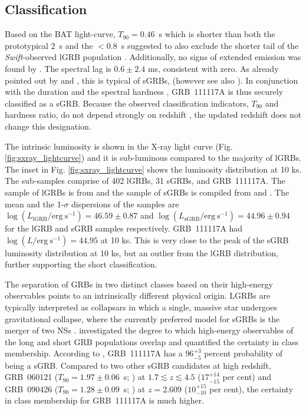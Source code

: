 \documentclass[referee]{aa}
\begin{document}
\subsection{Classification} \label{classification}

Based on the BAT light-curve, $T_{90}=0.46$~s which is shorter than both the
prototypical 2~s \citep{Kouveliotou1993} and the $<0.8$~s suggested to also
exclude the shorter tail of the \textit{Swift}-observed lGRB population
\citep{Bromberg2012a}. Additionally, no signs of extended emission was found by
\citet{Sakamoto2013}. The spectral lag is $0.6 \pm2.4$ ms, consistent with zero.
As already pointed out by \citet{Margutti2012} and \citet{Sakamoto2013}, this is
typical of sGRBs, (however see also \citealt{Bernardini2015}). In conjunction
with the duration and the spectral hardness \citep{Sakamoto2011}, GRB~111117A is
thus securely classified as a sGRB. Because the observed classification
indicators, $T_{90}$ and hardness ratio, do not depend strongly on redshift
\citep{Littlejohns2013a}, the updated redshift does not change this designation.

The intrinsic luminosity is shown in the X-ray light curve (Fig.
\ref{fig:sxray_lightcurve}) and it is sub-luminous compared to the majority of
lGRBs. The inset in Fig. \ref{fig:sxray_lightcurve} shows the luminosity
distribution at 10 ks. The sub-samples comprise of 402 lGRBs, 31 sGRBs, and
GRB~111117A. The sample of lGRBs is from \citet{Evans2007, Evans2009} and the
sample of sGRBs is compiled from \citet{Kann2011, Berger2014} and
\citet{DAvanzo2014a}. The mean and the 1-$\sigma$ dispersions of the samples are
$\log(L_{\mathrm{lGRB}} / \mathrm{erg~s}^{-1}) = 46.59 \pm 0.87$ and
$\log(L_{\mathrm{sGRB}} / \mathrm{erg~s}^{-1})  = 44.96 \pm 0.94$ for the lGRB
and sGRB samples respectively. GRB~111117A had $\log(L / \mathrm{erg~s}^{-1}) =
44.95$ at 10 ks. This is very close to the peak of the sGRB luminosity
distribution at 10 ks, but an outlier from the lGRB distribution, further
supporting the short classification.

The separation of GRBs in two distinct classes based on their high-energy
observables points to an intrinsically different physical origin. LGRBs are
typically interpreted as collapsars \citep{MacFadyen1999} in which a single, massive
star undergoes gravitational collapse, where the currently preferred model for
sGRBs is the merger of two NSs \citep{Eichler1989, Nakar2007}.
\citet{Bromberg2013} investigated the degree to which high-energy observables of
the long and short GRB populations overlap and quantified the certainty in class
membership. According to \citet{Bromberg2013}, GRB~111117A has a $96_{-5}^{+3}$
percent probability of being a sGRB. Compared to two other sGRB candidates
at high redshift, GRB~060121 ($T_{90}=1.97 \pm 0.06$~s;
\citealt{DeUgartePostigo2006, Levan2006}) at $1.7 \lesssim z \lesssim 4.5$
($17_{-15}^{+14}$ per cent) and GRB~090426 ($T_{90}=1.28 \pm 0.09$~s;
\citealt{Antonelli2009, Levesque2010, Thone2011}) at $z = 2.609$ ($10_{-10}^{+15}$
per cent), the certainty in class membership for GRB~111117A is much higher.
\end{document}
